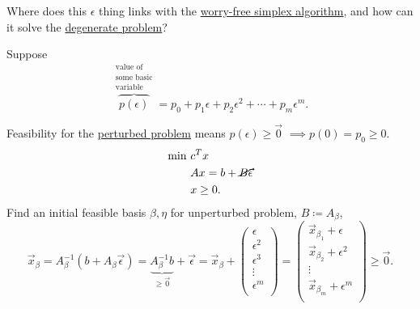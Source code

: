 \begin{problem}
Where does this \(\epsilon \) thing links with the \hyperref[algo:worry-free-simplex-algorithm]{worry-free simplex algorithm},
and how can it solve the \hyperref[prob:degenerate-problem]{degenerate problem}?
\end{problem}
\begin{answer}
	Suppose
	\[
		\overbrace{p(\epsilon)}^{\substack{\text{value of}\\ \text{some basic}\\ \text{variable}}} = p_0 + p_1 \epsilon + p_2 \epsilon^2 + \cdots + p_m \epsilon^m.
	\]

	Feasibility for the \hyperref[def:perturbed-problem]{perturbed problem} means \(p(\epsilon) \geq \vec{0}\) \(\implies p(0) = p_0 \geq 0\).
	\begin{align*}
		\min~ & c^Tx                              \\
		      & Ax = b + \cancel{B\vec{\epsilon}} \\
		      & x\geq 0.
	\end{align*}
	Find an initial feasible basis \(\beta, \eta \) for unperturbed problem, \(B\coloneqq A_{\beta}\),
	\[
		\vec{x}_{\beta}
		= A_{\beta}^{-1}(b + A_{\beta} \vec{\epsilon})
		= \underbrace{A^{-1}_{\beta}b}_{\geq \vec{0}} + \vec{\epsilon}
		= \vec{x}_{\beta} + \begin{pmatrix}
			\epsilon   \\
			\epsilon^2 \\
			\epsilon^3 \\
			\vdots     \\
			\epsilon^m \\
		\end{pmatrix} = \begin{pmatrix}
			\vec{x}_{\beta_1} + \epsilon   \\
			\vec{x}_{\beta_2} + \epsilon^2 \\
			\vdots                         \\
			\vec{x}_{\beta_m} + \epsilon^m \\
		\end{pmatrix} \geq \vec{0}.
	\]


\end{answer}
